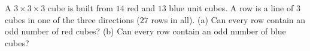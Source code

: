 A $3\times3\times3$ cube is built from $14$ red and $13$ blue unit cubes. A row is a line of $3$ cubes in one of the three directions ($27$ rows in all). (a) Can every row contain an odd number of red cubes? (b) Can every row contain an odd number of blue cubes?
